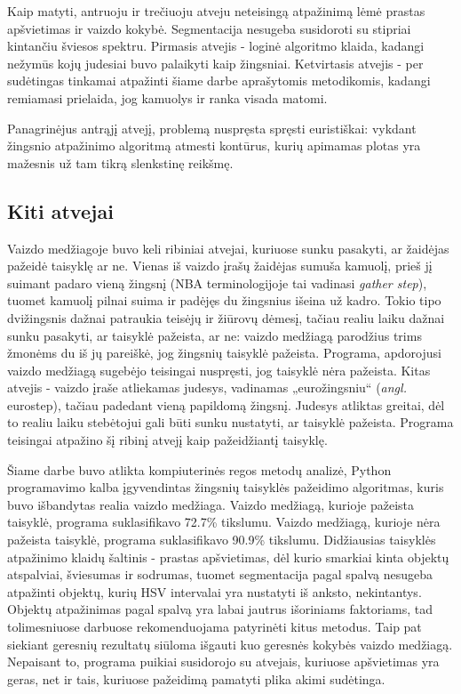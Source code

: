 \documentclass{VUMIFPSkursinis}
\begin{document}
Kaip matyti, antruoju ir trečiuoju atveju neteisingą atpažinimą lėmė prastas apšvietimas ir vaizdo kokybė. Segmentacija nesugeba susidoroti su stipriai kintančiu šviesos spektru. Pirmasis atvejis - loginė algoritmo klaida, kadangi nežymūs kojų judesiai buvo palaikyti kaip žingsniai. Ketvirtasis atvejis - per sudėtingas tinkamai atpažinti šiame darbe aprašytomis metodikomis, kadangi remiamasi prielaida, jog kamuolys ir ranka visada matomi.

Panagrinėjus antrąjį atvejį, problemą nuspręsta spręsti euristiškai: vykdant žingsnio atpažinimo algoritmą atmesti kontūrus, kurių apimamas plotas yra mažesnis už tam tikrą slenkstinę reikšmę. 

\subsection{Kiti atvejai}
 Vaizdo medžiagoje buvo keli ribiniai atvejai, kuriuose sunku pasakyti, ar žaidėjas pažeidė taisyklę ar ne. Vienas iš vaizdo įrašų žaidėjas sumuša kamuolį, prieš jį suimant padaro vieną žingsnį (NBA terminologijoje tai vadinasi \textit{gather step}), tuomet kamuolį pilnai suima ir padėjęs du žingsnius išeina už kadro. Tokio tipo dvižingsnis dažnai patraukia teisėjų ir žiūrovų dėmesį, tačiau realiu laiku dažnai sunku pasakyti, ar taisyklė pažeista, ar ne: vaizdo medžiagą parodžius trims žmonėms du iš jų pareiškė, jog žingsnių taisyklė pažeista. Programa, apdorojusi vaizdo medžiagą sugebėjo teisingai nuspręsti, jog taisyklė nėra pažeista. Kitas atvejis - vaizdo įraše atliekamas judesys, vadinamas „eurožingsniu“ (\textit{angl.} eurostep), tačiau padedant vieną papildomą žingsnį. Judesys atliktas greitai, dėl to realiu laiku stebėtojui gali būti sunku nustatyti, ar taisyklė pažeista. Programa teisingai atpažino šį ribinį atvejį kaip pažeidžiantį taisyklę. 


Šiame darbe buvo atlikta kompiuterinės regos metodų analizė, Python programavimo kalba įgyvendintas žingsnių taisyklės pažeidimo algoritmas, kuris buvo išbandytas realia vaizdo medžiaga. Vaizdo medžiagą, kurioje pažeista taisyklė, programa suklasifikavo 72.7\% tikslumu. Vaizdo medžiagą, kurioje nėra pažeista taisyklė, programa suklasifikavo 90.9\% tikslumu. Didžiausias taisyklės atpažinimo klaidų šaltinis - prastas apšvietimas, dėl kurio smarkiai kinta objektų atspalviai, šviesumas ir sodrumas, tuomet segmentacija pagal spalvą nesugeba atpažinti objektų, kurių HSV intervalai yra nustatyti iš anksto, nekintantys. Objektų atpažinimas pagal spalvą yra labai jautrus išoriniams faktoriams, tad tolimesniuose darbuose rekomenduojama patyrinėti kitus metodus. Taip pat siekiant geresnių rezultatų siūloma išgauti kuo geresnės kokybės vaizdo medžiagą.
Nepaisant to, programa puikiai susidorojo su atvejais, kuriuose apšvietimas yra geras, net ir tais, kuriuose pažeidimą pamatyti plika akimi sudėtinga. 
\end{document}
